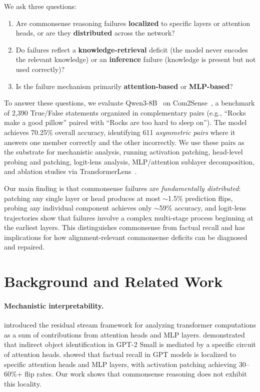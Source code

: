 \documentclass{article}
\begin{document}
We ask three questions:
\begin{enumerate}
    \item Are commonsense reasoning failures \textbf{localized} to specific layers or attention heads, or are they \textbf{distributed} across the network?
    \item Do failures reflect a \textbf{knowledge-retrieval} deficit (the model never encodes the relevant knowledge) or an \textbf{inference} failure (knowledge is present but not used correctly)?
    \item Is the failure mechanism primarily \textbf{attention-based} or \textbf{MLP-based}?
\end{enumerate}

To answer these questions, we evaluate Qwen3-8B~\citep{qwen3} on Com2Sense~\citep{singh2021com2sense}, a benchmark of 2,390 True/False statements organized in complementary pairs (e.g., ``Rocks make a good pillow'' paired with ``Rocks are too hard to sleep on''). The model achieves 70.25\% overall accuracy, identifying 611 \emph{asymmetric pairs} where it answers one member correctly and the other incorrectly. We use these pairs as the substrate for mechanistic analysis, running activation patching, head-level probing and patching, logit-lens analysis, MLP/attention sublayer decomposition, and ablation studies via TransformerLens~\citep{nanda2022transformerlens}.

Our main finding is that commonsense failures are \emph{fundamentally distributed}: patching any single layer or head produces at most $\sim$1.5\% prediction flips, probing any individual component achieves only $\sim$59\% accuracy, and logit-lens trajectories show that failures involve a complex multi-stage process beginning at the earliest layers. This distinguishes commonsense from factual recall and has implications for how alignment-relevant commonsense deficits can be diagnosed and repaired.

\section{Background and Related Work}
\label{sec:background}

\paragraph{Mechanistic interpretability.}
\citet{elhage2021mathematical} introduced the residual stream framework for analyzing transformer computations as a sum of contributions from attention heads and MLP layers. \citet{wang2022interpretability} demonstrated that indirect object identification in GPT-2 Small is mediated by a specific circuit of attention heads. \citet{geva2023dissecting} showed that factual recall in GPT models is localized to specific attention heads and MLP layers, with activation patching achieving 30--60\%+ flip rates. Our work shows that commonsense reasoning does not exhibit this locality.
\end{document}

